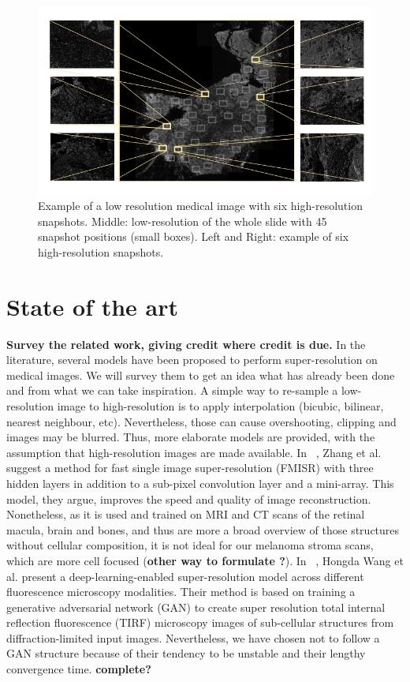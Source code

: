 \documentclass[11pt,conference,compsocconf]{IEEEtran}
\begin{document}
 \begin{figure}[tbp]
  \centering
  \includegraphics[width=\columnwidth]{doc/report/images/scan1.jpg}
  \caption{Example of a low resolution medical image with six high-resolution
snapshots. Middle: low-resolution of the whole slide with 45 snapshot positions
(small boxes). Left and Right: example of six high-resolution snapshots.}
  \vspace{-3mm}
  \label{fig:melanoma-scan}
\end{figure}


\section{State of the art}\label{sec:state-of-art}
\textbf{Survey the related work, giving credit where credit is
  due.} In the literature, several models have been proposed to perform super-resolution on medical images. We will survey them to get an idea what has already been done and from what we can take inspiration. A simple way to re-sample a low-resolution image to high-resolution is to apply interpolation (bicubic, bilinear, nearest neighbour, etc). Nevertheless, those can cause overshooting, clipping and images may be blurred. Thus, more elaborate models are provided, with the assumption that high-resolution images are made available. In ~\cite{zhang2019}, Zhang et al. suggest a method for fast single image super-resolution (FMISR) with three hidden layers in addition to a sub-pixel convolution layer and a mini-array. This model, they argue, improves the speed and quality of image reconstruction. Nonetheless, as it is used and trained on MRI and CT scans of the retinal macula, brain and bones, and thus are more a broad overview of those structures without cellular composition, it is not ideal for our melanoma stroma scans, which are more cell focused (\textbf{other way to formulate ?}). In ~\cite{nature2019}, Hongda Wang et al. present a deep-learning-enabled super-resolution model across different fluorescence microscopy modalities. Their method is based on training a generative adversarial network (GAN) to create super resolution total internal reflection fluorescence (TIRF) microscopy images of sub-cellular structures from diffraction-limited input images. Nevertheless, we have chosen not to follow a GAN structure because of their tendency to be unstable and their lengthy convergence time. \textbf{complete?}
\end{document}
